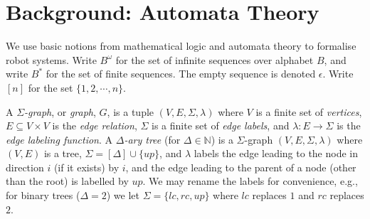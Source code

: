 \documentclass{llncs}
\newcommand{\head}[1]{\vspace{2mm} \noindent  {\bf #1}}
\newtheorem{example}{Example}
\def\nat{\mathbb{N}}
\def\deg{\textsf{deg}}
\begin{document}
\vspace{-1mm}
\section{Background: Automata Theory}  \label{sec:prelim}
\vspace{-1mm}
We use basic notions from mathematical logic \cite{EbFl95} and automata theory \cite{HMU03} to formalise robot systems.
%
Write $B^\omega$ for the set of infinite sequences over alphabet $B$, and write $B^*$ for the set of finite sequences. The empty sequence is denoted $\epsilon$. Write $[n]$ for the set $\{1,2,\cdots,n\}$.



\head{Graphs and Trees.}
A {\em $\Sigma$-graph}, or {\em graph}, $G$, is a tuple $(V,E,\Sigma,\lambda)$ where $V$ is a finite set of {\em vertices}, $E \subseteq V \times V$ is the {\em edge relation}, $\Sigma$ is a finite set of {\em edge labels}, and $\lambda:E \to \Sigma$ is the {\em edge labeling function}.
%
%
%
A {\em $\Delta$-ary tree} (for $\Delta \in \nat$) is a $\Sigma$-graph $(V,E,\Sigma,\lambda)$ where $(V,E)$ is a tree, $\Sigma = [\Delta] \cup \{up\}$, and $\lambda$ labels the edge leading to the node in direction $i$ (if it exists) by $i$, and the edge leading to the parent of a node (other than the root) is labelled by $up$. We may rename the labels for convenience, e.g., for binary trees ($\Delta = 2$) we let $\Sigma = \{lc,rc,up\}$ where $lc$ replaces $1$ and $rc$ replaces $2$.


\end{document}
